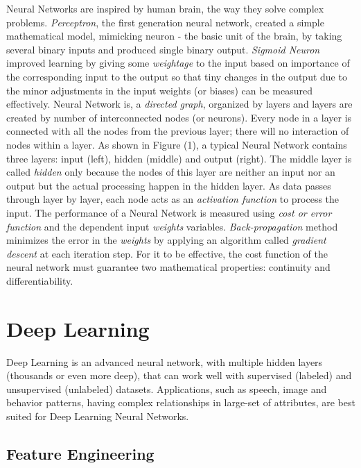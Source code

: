 \documentclass[sigconf]{acmart}
\begin{document}
	Neural Networks are inspired by human brain, the way they solve complex problems. {\em Perceptron}, the first generation neural network, created a simple mathematical model, mimicking neuron - the basic unit of the brain, by taking several binary inputs and produced single binary output. {\em Sigmoid Neuron} improved learning by giving some {\em weightage} to the input based on importance of the corresponding input to the output so that tiny changes in the output due to the minor adjustments in the input weights (or biases) can be measured effectively. Neural Network is, a {\em directed graph}, organized by layers and layers are created by number of interconnected nodes (or neurons). Every node in a layer is connected with all the nodes from the previous layer; there will no interaction of nodes within a layer. As shown in Figure (1), a typical Neural Network contains three layers: input (left), hidden (middle) and output (right). The middle layer is called {\em hidden} only because the nodes of this layer are neither an input nor an output but the actual processing happen in the hidden layer. As data passes through layer by layer, each node acts as an {\em activation function} to process the input. The performance of a Neural Network is measured using {\em cost or error function} and the dependent input {\em weights} variables. {\em Back-propagation} method minimizes the error in the {\em weights} by applying an algorithm called {\em gradient descent} at each iteration step. For it to be effective, the cost function of the neural network must guarantee two mathematical properties: continuity and differentiability.
	
	\section{Deep Learning}
	
	Deep Learning is an advanced neural network, with multiple hidden layers (thousands or even more deep), that can work well with supervised (labeled) and unsupervised (unlabeled) datasets. Applications, such as speech, image and behavior patterns, having complex relationships in large-set of attributes, are best suited for Deep Learning Neural Networks.	
	
	\subsection{Feature Engineering}
	
\end{document}
